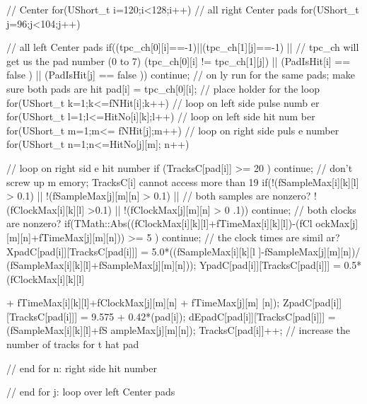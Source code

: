 \begin{DoxyCode}
{{{{{{{{{{          // Center
          for(UShort_t i=120;i<128;i++) // all right Center pads
            for(UShort_t j=96;j<104;j++){ // all left Center pads
              if((tpc_ch[0][i]==-1)||(tpc_ch[1][j]==-1) || // tpc_ch will get us 
      the pad number (0 to 7)
              (tpc_ch[0][i] != tpc_ch[1][j]) || 
              (PadIsHit[i] == false ) || (PadIsHit[j] == false )) continue; // on
      ly run for the same pads; make sure both pads are hit
                pad[i] = tpc_ch[0][i]; // place holder for the loop
                for(UShort_t k=1;k<=fNHit[i];k++) // loop on left side pulse numb
      er
                for(UShort_t l=1;l<=HitNo[i][k];l++) // loop on left side hit num
      ber
                    for(UShort_t m=1;m<= fNHit[j];m++) // loop on right side puls
      e number
                      for(UShort_t n=1;n<=HitNo[j][m]; n++){ // loop on right sid
      e hit number
                        if (TracksC[pad[i]] >= 20 ) continue; // don't screw up m
      emory; TracksC[i] cannot access more than 19
                        if(!(fSampleMax[i][k][l] > 0.1) || !(fSampleMax[j][m][n] 
      > 0.1)  || // both samples are nonzero?
                           !(fClockMax[i][k][l] >0.1) || !(fClockMax[j][m][n] > 0
      .1)) continue;  // both clocks are nonzero?
                        if(TMath::Abs((fClockMax[i][k][l]+fTimeMax[i][k][l])-(fCl
      ockMax[j][m][n]+fTimeMax[j][m][n])) >= 5 ) continue; // the clock times are simil
      ar?
                        XpadC[pad[i]][TracksC[pad[i]]] = 5.0*((fSampleMax[i][k][l
      ]-fSampleMax[j][m][n])/
                          (fSampleMax[i][k][l]+fSampleMax[j][m][n]));
                        YpadC[pad[i]][TracksC[pad[i]]] = 0.5*(fClockMax[i][k][l] 
      
                          + fTimeMax[i][k][l]+fClockMax[j][m][n] + fTimeMax[j][m]
      [n]);
                        ZpadC[pad[i]][TracksC[pad[i]]] = 9.575 + 0.42*(pad[i]); 
                        dEpadC[pad[i]][TracksC[pad[i]]] = (fSampleMax[i][k][l]+fS
      ampleMax[j][m][n]);
                        TracksC[pad[i]]++; // increase the number of tracks for t
      hat pad
                      } // end for n: right side hit number
            } // end for j: loop over left Center pads 
          
}}}}}}}}}}
\end{DoxyCode}
